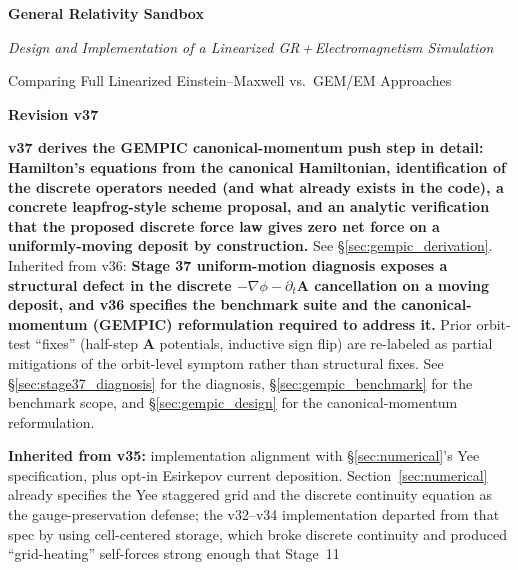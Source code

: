 \documentclass[11pt,a4paper]{article}
\newcommand{\vv}[1]{\mathbf{#1}}
\begin{document}

\begin{titlepage}
  \centering
  \vspace*{3cm}
  {\Huge\bfseries\color{deepblue} General Relativity Sandbox\par}
  \vspace{0.8cm}
  {\large\itshape Design and Implementation of a Linearized GR\,+\,Electromagnetism Simulation\par}
  \vspace{0.4cm}
  {\normalsize\color{gray} Comparing Full Linearized Einstein--Maxwell vs.\ GEM/EM Approaches\par}
  \vspace{1.2cm}
  {\large\bfseries\color{midblue} Revision v37\par}
  \vspace{0.2cm}
  {\small\color{gray}
  \textbf{v37 derives the GEMPIC canonical-momentum push step in
  detail: Hamilton's equations from the canonical Hamiltonian,
  identification of the discrete operators needed (and what already
  exists in the code), a concrete leapfrog-style scheme proposal, and
  an analytic verification that the proposed discrete force law gives
  zero net force on a uniformly-moving deposit by construction.}
  See §\ref{sec:gempic_derivation}.
  Inherited from v36:
  \textbf{Stage 37 uniform-motion diagnosis exposes a structural defect
  in the discrete $-\nabla\phi - \partial_t\vv{A}$ cancellation on a
  moving deposit, and v36 specifies the benchmark suite and the
  canonical-momentum (GEMPIC) reformulation required to address it.}
  Prior orbit-test ``fixes'' (half-step $\vv{A}$ potentials, inductive
  sign flip) are re-labeled as partial mitigations of the orbit-level
  symptom rather than structural fixes.  See
  §\ref{sec:stage37_diagnosis} for the diagnosis, §\ref{sec:gempic_benchmark}
  for the benchmark scope, and §\ref{sec:gempic_design} for the
  canonical-momentum reformulation.\par
  \vspace{0.4em}
  \textbf{Inherited from v35:} implementation alignment with §\ref{sec:numerical}'s Yee
  specification, plus opt-in Esirkepov current deposition.
  Section~\ref{sec:numerical} already specifies the Yee staggered
  grid and the discrete continuity equation as the gauge-preservation
  defense; the v32--v34 implementation departed from that spec by
  using cell-centered storage, which broke discrete continuity and
  produced ``grid-heating'' self-forces strong enough that Stage~11
}
\end{titlepage}
\end{document}
